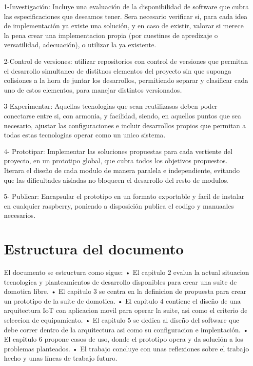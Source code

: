 1-Investigación: Incluye una evaluación de la disponibilidad de software que cubra las especificaciones que deseamos tener. Sera necesario verificar si, para cada idea de implementación ya existe una solución, y en caso de existir, valorar si merece la pena crear una implementacion propia (por cuestines de apredizaje o versatilidad, adecuación), o utilizar la ya existente.

2-Control de versiones: utilizar repositorios con control de versiones que permitan el desarrollo simultaneo de distitnos elementos del proyecto sin que suponga colisiones a la hora de juntar los desarrollos, permitiendo separar y clasificar cada uno de estos elementos, para manejar distintos versionados.

3-Experimentar: Aquellas tecnologias que sean reutilizasas deben poder conectarse entre si, con armonia, y facilidad, siendo, en aquellos puntos que sea necesario, ajustar las configuraciones e incluir desarrollos propios que permitan a todas estas tecnologias operar como un unico sistema.

4- Prototipar: Implementar las soluciones propuestas para cada vertiente del proyecto, en un prototipo global, que cubra todos los objetivos propuestos. Iterara el diseño de cada modulo de manera paralela e independiente, evitando que las dificultades aisladas no bloqueen el desarrollo del resto de modulos.

5- Publicar: Encapsular el prototipo en un formato exportable y facil de instalar en cualquier raspberry, poniendo a disposición publica el codigo y manuaales necesarios.

\section{Estructura del documento}
\label{ch:Capitulo1.4}

El documento se estructura como sigue:
• El capitulo 2 evalua la actual situacion tecnologica y planteamientos de desarrollo disponibles para crear una suite de domotica libre.
• El capitulo 3 se centra en la definicion de propuesta para crear un prototipo de la suite de domotica.
• El capitulo 4 contiene el diseño de una arquitectura IoT con aplicacion movil para operar la suite, asi como el criterio de seleccion de equipamiento.
• El capitulo 5 se dedica al diseño del software que debe correr dentro de la arquitectura asi como su configuracion e implentación.
• El capitulo 6 propone casos de uso, donde el prototipo opera y da solución a los problemas planteados.
• El trabajo concluye con unas reflexiones sobre el trabajo hecho y unas líneas de trabajo futuro.
